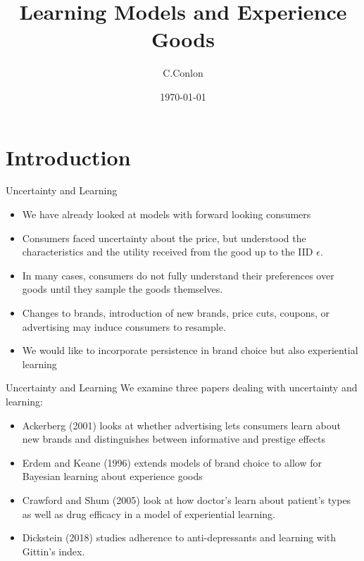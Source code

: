 \documentclass[aspectratio=169,11pt]{beamer}
\title{Learning Models and Experience Goods}
\author{C.Conlon}
\institute{Grad IO }
\date{\today}
\begin{document}
\maketitle

\section*{Introduction}



\begin{frame}{Uncertainty and Learning}
\begin{itemize}
\item We have already looked at models with forward looking consumers
\item Consumers faced uncertainty about the price, but understood the characteristics and the utility received from the good up to the IID $\epsilon$.
\item In many cases, consumers do not fully understand their preferences over goods until they sample the goods themselves.
\item Changes to brands, introduction of new brands, price cuts, coupons, or advertising may induce consumers to resample.
\item We would like to incorporate \alert{persistence} in brand choice but also \alert{experiential learning}
\end{itemize}
\end{frame} 


 
\begin{frame}{Uncertainty and Learning}
We examine three papers dealing with uncertainty and learning:
\begin{itemize}
\item Ackerberg (2001) looks at whether advertising lets consumers learn about new brands and distinguishes between informative and prestige effects
\item Erdem and Keane (1996) extends models of brand choice to allow for Bayesian learning about experience goods
\item Crawford and Shum (2005) look at how doctor's learn about patient's types as well as drug efficacy in a model of experiential learning.
\item Dickstein (2018) studies adherence to anti-depressants and learning with Gittin's index.
\end{itemize}
\end{frame}
\end{document}
